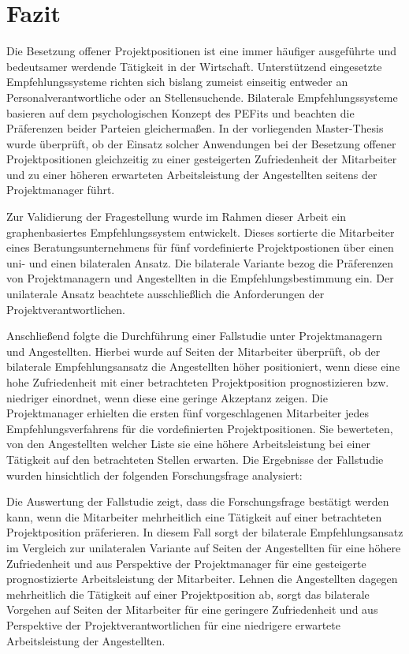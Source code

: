 \chapter{Fazit}
\label{ch:fazit}
Die Besetzung offener Projektpositionen ist eine immer häufiger ausgeführte und bedeutsamer werdende Tätigkeit in der Wirtschaft. Unterstützend eingesetzte Empfehlungssysteme richten sich bislang zumeist einseitig entweder an Personalverantwortliche oder an Stellensuchende. Bilaterale Empfehlungssysteme basieren auf dem psychologischen Konzept des \aclp{PEFit} und beachten die Präferenzen beider Parteien gleichermaßen. In der vorliegenden Master-Thesis wurde überprüft, ob der Einsatz solcher Anwendungen bei der Besetzung offener Projektpositionen gleichzeitig zu einer gesteigerten Zufriedenheit der Mitarbeiter und zu einer höheren erwarteten Arbeitsleistung der Angestellten seitens der Projektmanager führt. 

Zur Validierung der Fragestellung wurde im Rahmen dieser Arbeit ein graphenbasiertes Empfehlungssystem entwickelt. Dieses sortierte die Mitarbeiter eines Beratungsunternehmens für fünf vordefinierte Projektpostionen über einen uni- und einen bilateralen Ansatz. Die bilaterale Variante bezog die Präferenzen von Projektmanagern und Angestellten in die Empfehlungsbestimmung ein. Der unilaterale Ansatz beachtete ausschließlich die Anforderungen der Projektverantwortlichen.

Anschließend folgte die Durchführung einer Fallstudie unter Projektmanagern und Angestellten. Hierbei wurde auf Seiten der Mitarbeiter überprüft, ob der bilaterale Empfehlungsansatz die Angestellten höher positioniert, wenn diese eine hohe Zufriedenheit mit einer betrachteten Projektposition prognostizieren bzw. niedriger einordnet, wenn diese eine geringe Akzeptanz zeigen. Die Projektmanager erhielten die ersten fünf vorgeschlagenen Mitarbeiter jedes Empfehlungsverfahrens für die vordefinierten Projektpositionen. Sie bewerteten, von den Angestellten welcher Liste sie eine höhere Arbeitsleistung bei einer Tätigkeit auf den betrachteten Stellen erwarten. Die Ergebnisse der Fallstudie wurden hinsichtlich der folgenden Forschungsfrage analysiert: \forschungsfrage

Die Auswertung der Fallstudie zeigt, dass die Forschungsfrage bestätigt werden kann, wenn die Mitarbeiter mehrheitlich eine Tätigkeit auf einer betrachteten Projektposition präferieren. In diesem Fall sorgt der bilaterale Empfehlungsansatz im Vergleich zur unilateralen Variante auf Seiten der Angestellten für eine höhere Zufriedenheit und aus Perspektive der Projektmanager für eine gesteigerte prognostizierte Arbeitsleistung der Mitarbeiter. Lehnen die Angestellten dagegen mehrheitlich die Tätigkeit auf einer Projektposition ab, sorgt das bilaterale Vorgehen auf Seiten der Mitarbeiter für eine geringere Zufriedenheit und aus Perspektive der Projektverantwortlichen für eine niedrigere erwartete Arbeitsleistung der Angestellten.

